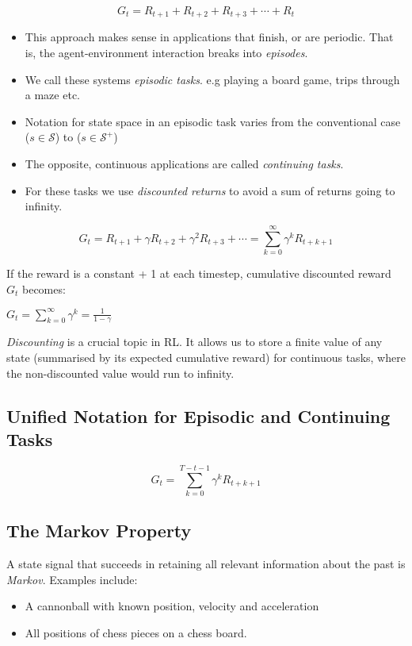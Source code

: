 \begin{equation}
	G_t = R_{t+1} + R_{t+2} + R_{t+3} + \cdots + R_t
\end{equation}

\begin{itemize}
	\item This approach makes sense in applications that finish, or are periodic. That is, the agent-environment interaction breaks into \textit{episodes}.
	\item We call these systems \textit{episodic tasks}. e.g playing a board game, trips through a maze etc.
	\item Notation for state space in an episodic task varies from the conventional case (\(s \in \mathcal{S}\)) to (\(s \in \mathcal{S^+}\))
	\item The opposite, continuous applications are called \textit{continuing tasks}.
	\item For these tasks we use \textit{discounted returns} to avoid a sum of returns going to infinity.
\end{itemize}

\begin{equation}
	G_t = R_{t+1} + \gamma R_{t+2} + \gamma^2 R_{t+3} + \cdots = \sum_{k=0}^{\infty} \gamma^k R_{t+k+1} 
\end{equation}

If the reward is a constant + 1 at each timestep, cumulative discounted reward $G_t$ becomes:

$
G_t = \sum_{k=0}^{\infty} \gamma^k = \frac{1}{1 - \gamma}
$

\textit{Discounting} is a crucial topic in RL. It allows us to store a finite value of any state (summarised by its expected cumulative reward) for continuous tasks, where the non-discounted value would run to infinity. 

\subsection{Unified Notation for Episodic and Continuing Tasks}
\begin{equation}
	G_t = \sum_{k=0}^{T-t-1} \gamma^k R_{t+k+1} 
\end{equation}

\subsection{The Markov Property}
A state signal that succeeds in retaining all relevant information about the past is \textit{Markov}. Examples include:
\begin{itemize}
\item A cannonball with known position, velocity and acceleration
\item All positions of chess pieces on a chess board.
\end{itemize}

